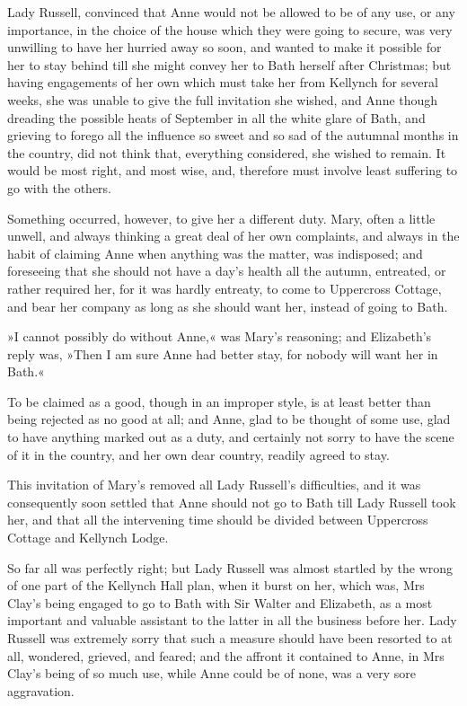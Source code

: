 Lady Russell, convinced that Anne would not be allowed to be of any use, or any importance, in the choice of the house which they were going to secure, was very unwilling to have her hurried away so soon, and wanted to make it possible for her to stay behind till she might convey her to Bath herself after Christmas; but having engagements of her own which must take her from Kellynch for several weeks, she was unable to give the full invitation she wished, and Anne though dreading the possible heats of September in all the white glare of Bath, and grieving to forego all the influence so sweet and so sad of the autumnal months in the country, did not think that, everything considered, she wished to remain. It would be most right, and most wise, and, therefore must involve least suffering to go with the others.

Something occurred, however, to give her a different duty. Mary, often a little unwell, and always thinking a great deal of her own complaints, and always in the habit of claiming Anne when anything was the matter, was indisposed; and foreseeing that she should not have a day's health all the autumn, entreated, or rather required her, for it was hardly entreaty, to come to Uppercross Cottage, and bear her company as long as she should want her, instead of going to Bath.

»I cannot possibly do without Anne,« was Mary's reasoning; and Elizabeth's reply was, »Then I am sure Anne had better stay, for nobody will want her in Bath.«

To be claimed as a good, though in an improper style, is at least better than being rejected as no good at all; and Anne, glad to be thought of some use, glad to have anything marked out as a duty, and certainly not sorry to have the scene of it in the country, and her own dear country, readily agreed to stay.

This invitation of Mary's removed all Lady Russell's difficulties, and it was consequently soon settled that Anne should not go to Bath till Lady Russell took her, and that all the intervening time should be divided between Uppercross Cottage and Kellynch Lodge.

So far all was perfectly right; but Lady Russell was almost startled by the wrong of one part of the Kellynch Hall plan, when it burst on her, which was, Mrs Clay's being engaged to go to Bath with Sir Walter and Elizabeth, as a most important and valuable assistant to the latter in all the business before her. Lady Russell was extremely sorry that such a measure should have been resorted to at all, wondered, grieved, and feared; and the affront it contained to Anne, in Mrs Clay's being of so much use, while Anne could be of none, was a very sore aggravation.

